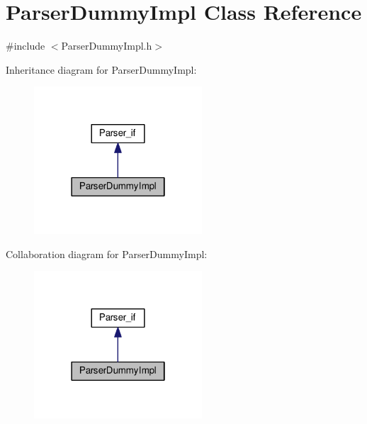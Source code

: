 \hypertarget{class_parser_dummy_impl}{}\section{Parser\+Dummy\+Impl Class Reference}
\label{class_parser_dummy_impl}


{\ttfamily \#include $<$Parser\+Dummy\+Impl.\+h$>$}



Inheritance diagram for Parser\+Dummy\+Impl\+:\nopagebreak
\begin{figure}[H]
\begin{center}
\leavevmode
\includegraphics[width=178pt]{class_parser_dummy_impl__inherit__graph}
\end{center}
\end{figure}


Collaboration diagram for Parser\+Dummy\+Impl\+:\nopagebreak
\begin{figure}[H]
\begin{center}
\leavevmode
\includegraphics[width=178pt]{class_parser_dummy_impl__coll__graph}
\end{center}
\end{figure}
